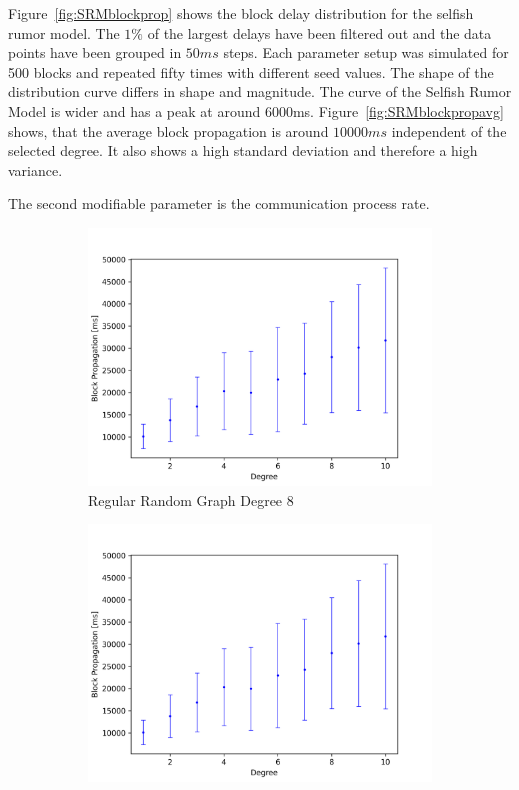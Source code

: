 Figure~\ref{fig:SRMblockprop} shows the block delay distribution for the selfish rumor model. The $1\% $ of the largest delays have been filtered out and the data points have been grouped in $50ms$ steps. Each parameter setup was simulated for 500 blocks and repeated fifty times with different seed values.
The shape of the distribution curve differs in shape and magnitude. The curve of the Selfish Rumor Model is wider and has a peak at around 6000ms.
Figure~\ref{fig:SRMblockpropavg} shows, that the average block propagation is around $10000ms$ independent of the selected degree. It also shows a high standard deviation and therefore a high variance.

The second modifiable parameter is the communication process rate.
\begin{figure}[ht]
	\begin{subfigure}[b]{0.48\textwidth}
		\includegraphics[width=\textwidth]{figures/avg_propagation_comm_rate_search.png}
		\caption{Regular Random Graph Degree 8}
		\label{fig:CommSearch8}
	\end{subfigure}
	\hfill
	\begin{subfigure}[b]{0.48\textwidth}
		\includegraphics[width=\textwidth]{figures/avg_propagation_comm_rate_search.png}

\end{subfigure}
\end{figure}

